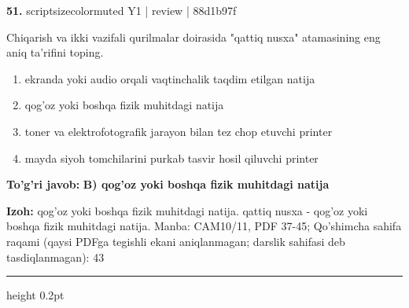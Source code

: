 \documentclass[10pt,a4paper]{article}
\begin{document}
{\bfseries\sffamily\color{ink} 51.} {scriptsizecolor{muted} Y1 | review | 88d1b97f}
\par
Chiqarish va ikki vazifali qurilmalar doirasida "qattiq nusxa" atamasining eng aniq ta'rifini toping.
\begin{enumerate}[label=\Alph*),leftmargin=9mm]
\item ekranda yoki audio orqali vaqtinchalik taqdim etilgan natija
\item qog'oz yoki boshqa fizik muhitdagi natija
\item toner va elektrofotografik jarayon bilan tez chop etuvchi printer
\item mayda siyoh tomchilarini purkab tasvir hosil qiluvchi printer
\end{enumerate}
\begin{tcolorbox}[enhanced,breakable,colback=teal!4,colframe=teal!60!black,boxrule=0.45pt,arc=1.2mm,left=2.7mm,right=2.7mm,top=1.8mm,bottom=1.8mm,before skip=2mm,after skip=2mm]
{\bfseries\sffamily\color{teal}To'g'ri javob:} \textbf{B) qog'oz yoki boshqa fizik muhitdagi natija}
\par\smallskip
{\bfseries Izoh:} qog'oz yoki boshqa fizik muhitdagi natija. qattiq nusxa - qog'oz yoki boshqa fizik muhitdagi natija. Manba: CAM10/11, PDF 37-45; Qo'shimcha sahifa raqami (qaysi PDFga tegishli ekani aniqlanmagan; darslik sahifasi deb tasdiqlanmagan): 43
\end{tcolorbox}
\vspace{2mm}\hrule height 0.2pt\vspace{3mm}
\end{document}
